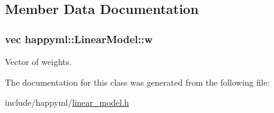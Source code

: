 \subsection{Member Data Documentation}
\subsubsection[{\texorpdfstring{w}{w}}]{\setlength{\rightskip}{0pt plus 5cm}vec happyml\+::\+Linear\+Model\+::w\hspace{0.3cm}{\ttfamily [protected]}}\hypertarget{classhappyml_1_1LinearModel_af47eec5fba48e81065101c630070a0d9}{}\label{classhappyml_1_1LinearModel_af47eec5fba48e81065101c630070a0d9}


Vector of weights. 



The documentation for this class was generated from the following file\+:\begin{DoxyCompactItemize}
\item 
include/happyml/\hyperlink{linear__model_8h}{linear\+\_\+model.\+h}\end{DoxyCompactItemize}
